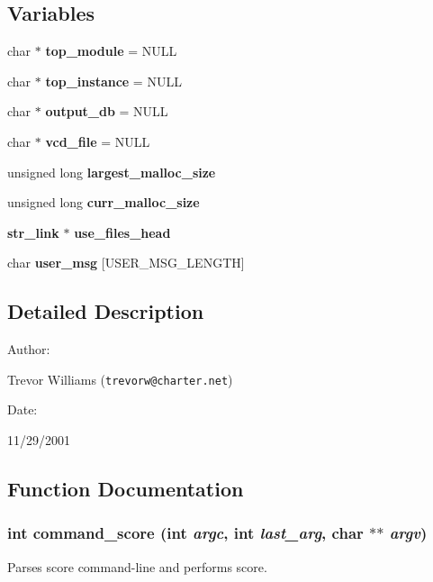 \subsection*{Variables}
\begin{CompactItemize}
\item 
char $\ast$ {\bf top\_\-module} = NULL
\item 
char $\ast$ {\bf top\_\-instance} = NULL
\item 
char $\ast$ {\bf output\_\-db} = NULL
\item 
char $\ast$ {\bf vcd\_\-file} = NULL
\item 
unsigned long {\bf largest\_\-malloc\_\-size}
\item 
unsigned long {\bf curr\_\-malloc\_\-size}
\item 
{\bf str\_\-link} $\ast$ {\bf use\_\-files\_\-head}
\item 
char {\bf user\_\-msg} [USER\_\-MSG\_\-LENGTH]
\end{CompactItemize}


\subsection{Detailed Description}


\begin{Desc}
\item[Author: ]\par
Trevor Williams ({\tt trevorw@charter.net}) \end{Desc}
\begin{Desc}
\item[Date: ]\par
11/29/2001\end{Desc}


\subsection{Function Documentation}
\subsubsection{\setlength{\rightskip}{0pt plus 5cm}int command\_\-score (int {\em argc}, int {\em last\_\-arg}, char $\ast$$\ast$ {\em argv})}\label{score_8c_a12}


Parses score command-line and performs score.

